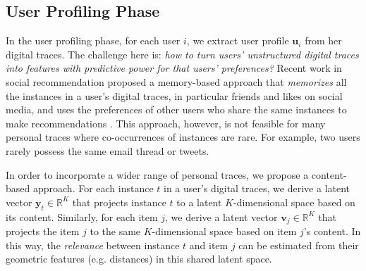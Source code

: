 \documentclass[conference]{IEEEtran}
\begin{document}
\subsection{User Profiling Phase}
In the user profiling phase, for each user $i$, we extract user profile $\mathbf{u}_i$ from her digital traces. The challenge here is: \textit{how to turn users' unstructured digital traces into features with predictive power for that users' preferences?} Recent work in social recommendation proposed a memory-based approach that \textit{memorizes} all the instances in a user's digital traces, in particular friends and likes on social media, and uses the preferences of other users who share the same instances to make recommendations \cite{Sedhain:2014:SCF}. This approach, however, is not feasible for many personal traces where co-occurrences of instances are rare. For example, two users rarely possess the same email thread or tweets.

In order to incorporate a wider range of personal traces, we propose a content-based approach. For each instance $t$ in a user's digital traces, we derive a latent vector $\mathbf{y}_t \in \mathbb{R}^K$ that projects instance $t$ to a latent $K$-dimensional space based on its content. Similarly, for each item $j$, we derive a latent vector $\mathbf{v}_j \in \mathbb{R}^K$ that projects the item $j$ to the same $K$-dimensional space based on item $j$'s content. In this way, the \textit{relevance} between instance $t$ and item $j$ can be estimated from their geometric features (e.g. distances) in this shared latent space. 
\end{document}
